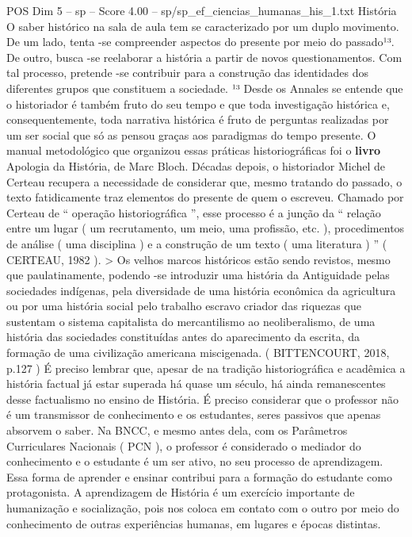 \begin{textsample}{POS Dim 5 – sp – Score 4.00 – sp/sp\_ef\_ciencias\_humanas\_his\_1.txt}  \label{ex:f5_pos_078}
História O saber histórico na sala de aula tem se caracterizado por um duplo movimento.
De um lado, tenta -se compreender aspectos do presente por meio do passado¹³.
De outro, busca -se reelaborar a história a partir de novos questionamentos.
Com tal processo, pretende -se contribuir para a construção das identidades dos diferentes grupos que constituem a sociedade. ¹³ Desde os Annales se entende que o historiador é também fruto do seu tempo e que toda investigação histórica e, consequentemente, toda narrativa histórica é fruto de perguntas realizadas por um ser social que só as pensou graças aos paradigmas do tempo presente.
O manual metodológico que organizou essas práticas historiográficas foi o \textbf{livro} Apologia da História, de Marc Bloch.
Décadas depois, o historiador Michel de Certeau recupera a necessidade de considerar que, mesmo tratando do passado, o texto fatidicamente traz elementos do presente de quem o escreveu.
Chamado por Certeau de “ operação historiográfica ”, esse processo é a junção da “ relação entre um lugar ( um recrutamento, um meio, uma profissão, etc. ), procedimentos de análise ( uma disciplina ) e a construção de um texto ( uma literatura ) ” ( CERTEAU, 1982 ). > Os velhos marcos históricos estão sendo revistos, mesmo que paulatinamente, podendo -se introduzir uma história da Antiguidade pelas sociedades indígenas, pela diversidade de uma história econômica da agricultura ou por uma história social pelo trabalho escravo criador das riquezas que sustentam o sistema capitalista do mercantilismo ao neoliberalismo, de uma história das sociedades constituídas antes do aparecimento da escrita, da formação de uma civilização americana miscigenada. ( BITTENCOURT, 2018, p.127 ) É preciso lembrar que, apesar de na tradição historiográfica e acadêmica a história factual já estar superada há quase um século, há ainda remanescentes desse factualismo no ensino de História.
É preciso considerar que o professor não é um transmissor de conhecimento e os estudantes, seres passivos que apenas absorvem o saber.
Na BNCC, e mesmo antes dela, com os Parâmetros Curriculares Nacionais ( PCN ), o professor é considerado o mediador do conhecimento e o estudante é um ser ativo, no seu processo de aprendizagem.
Essa forma de aprender e ensinar contribui para a formação do estudante como protagonista.
A aprendizagem de História é um exercício importante de humanização e socialização, pois nos coloca em contato com o outro por meio do conhecimento de outras experiências humanas, em lugares e épocas distintas.

\end{textsample}

